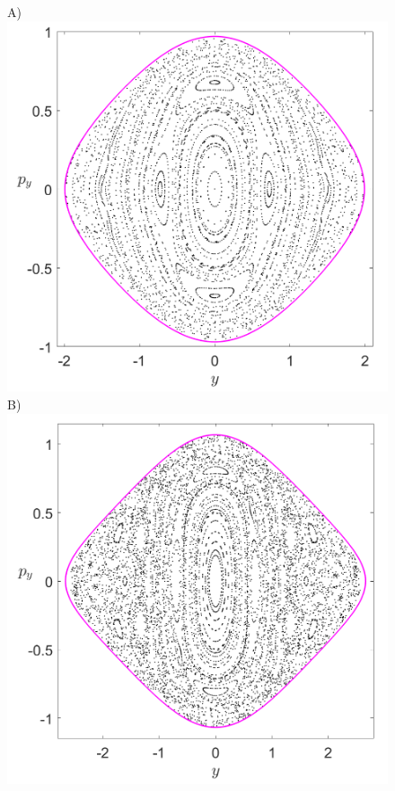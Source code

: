 \documentclass[10pt,aps,onecolumn,superscriptaddress]{revtex4-2}
\begin{document}
\begin{figure}[htbp]
	A)\includegraphics[scale=0.3]{PS_cirque_H_-0_2_x_0_w0_1div2_d_1_k_sqrt7.png}
	B)\includegraphics[scale=0.3]{PS_cirque_H_-0_1_x_0_w0_1div2_d_1_k_sqrt7.png}	

\end{figure}
\end{document}

